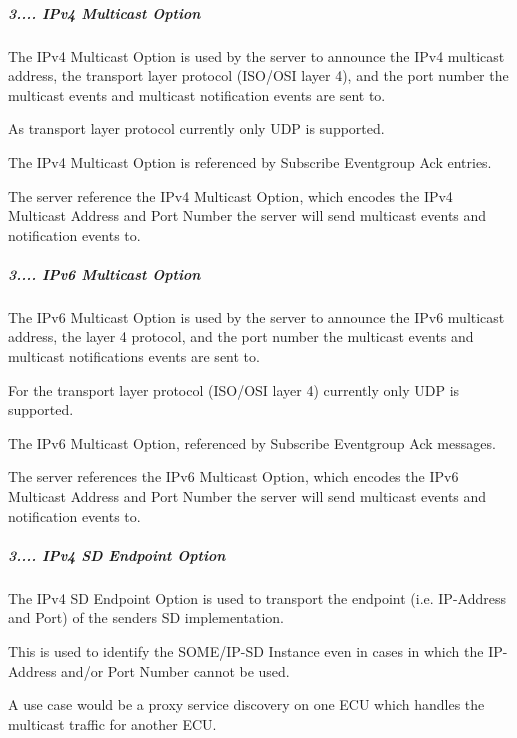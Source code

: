 \subparagraph*{3.... I\+Pv4 Multicast Option}


\begin{DoxyItemize}
\item The I\+Pv4 Multicast Option is used by the server to announce the I\+Pv4 multicast address, the transport layer protocol (I\+S\+O/\+O\+SI layer 4), and the port number the multicast events and multicast notification events are sent to.
\item As transport layer protocol currently only U\+DP is supported.
\item The I\+Pv4 Multicast Option is referenced by Subscribe Eventgroup Ack entries.
\item The server reference the I\+Pv4 Multicast Option, which encodes the I\+Pv4 Multicast Address and Port Number the server will send multicast events and notification events to. 
\end{DoxyItemize}

\subparagraph*{3.... I\+Pv6 Multicast Option}


\begin{DoxyItemize}
\item The I\+Pv6 Multicast Option is used by the server to announce the I\+Pv6 multicast address, the layer 4 protocol, and the port number the multicast events and multicast notifications events are sent to.
\item For the transport layer protocol (I\+S\+O/\+O\+SI layer 4) currently only U\+DP is supported.
\item The I\+Pv6 Multicast Option, referenced by Subscribe Eventgroup Ack messages.
\item The server references the I\+Pv6 Multicast Option, which encodes the I\+Pv6 Multicast Address and Port Number the server will send multicast events and notification events to. 
\end{DoxyItemize}

\subparagraph*{3.... I\+Pv4 SD Endpoint Option}


\begin{DoxyItemize}
\item The I\+Pv4 SD Endpoint Option is used to transport the endpoint (i.\+e. I\+P-\/\+Address and Port) of the senders SD implementation.
\item This is used to identify the S\+O\+M\+E/\+I\+P-\/\+SD Instance even in cases in which the I\+P-\/\+Address and/or Port Number cannot be used.
\item A use case would be a proxy service discovery on one E\+CU which handles the multicast traffic for another E\+CU. 
\end{DoxyItemize}

